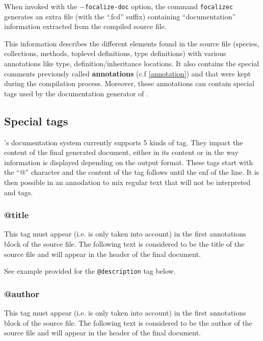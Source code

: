 When invoked with the {\tt $-$focalize-doc} option, the command
{\tt focalizec} generates an extra file (with the ``.fcd'' suffix)
containing ``documentation'' information extracted from the compiled
source file.

This information describes the different elements found in the source
file (species, collections, methods, toplevel definitions, type
definitions) with various annotations like type,
definition/inheritance locations. It also contains the special comments
previously called {\bf annotations} (c.f \ref{annotation}) and that
were kept during the compilation process. Moreover, these annotations
can contain special tags used by the documentation generator of
\focal.



\subsection{Special tags}
\focal's documentation system currently supports 5 kinds of
tag. They impact the content of the final generated document,
either in its content or in the way information is displayed depending
on the output format. These tags start with the ``@'' character and
the content of the tag follows until the enf of the line. It is then
possible in an annodation to mix regular text that will not be
interpreted and tags.

\subsubsection{@title}
This tag must appear (i.e. is only taken into account) in the first
annotations block of the source file. The following text is considered
to be the title of the source file and will appear in the header of
the final document.

See example provided for the {\tt @description} tag below.



\subsubsection{@author}
This tag must appear (i.e. is only taken into account) in the first
annotations block of the source file. The following text is considered
to be the author of the source file and will appear in the header of
the final document.

